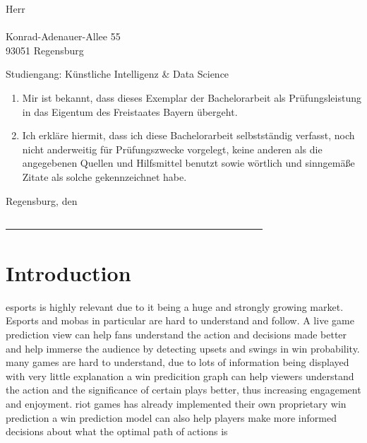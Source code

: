 \documentclass[12pt, a4paper, headinclude, twoside, plainheadsepline, open=right, numbers=noenddot, hidelinks, toc=listof, toc=bibliography]{scrreprt}
\begin{document}
\noindent
Herr\\
\@author\\
Konrad-Adenauer-Allee 55\\
93051 Regensburg\\
\smallskip

\noindent
Studiengang: Künstliche Intelligenz \& Data Science
\bigskip

\begin{enumerate}
\item Mir ist bekannt, dass dieses Exemplar der Bachelorarbeit als Prüfungsleistung in das Eigentum des Freistaates Bayern übergeht.
\item Ich erkläre hiermit, dass ich diese Bachelorarbeit selbstständig verfasst, noch nicht anderweitig für Prüfungszwecke vorgelegt, keine anderen als die angegebenen Quellen und Hilfsmittel benutzt sowie wörtlich und sinngemäße Zitate als solche gekennzeichnet habe.
\end{enumerate}
\vspace{1cm}
Regensburg, den \@date\\
\medskip
\medskip

\noindent
\underline{~~~~~~~~~~~~~~~~~~~~~~~~~~~~~~~~~~~~~~~~~~~~~~~~~~~~}\\
\@author

\makeatother



\cleardoublepage
{}\tableofcontents 										%




\pagestyle{scrheadings} 																%
\cleardoublepage
{} 																	%

\chapter{Introduction}
\label{chap:intro}


esports is highly relevant due to it being a huge and strongly growing market.
Esports and mobas in particular are hard to understand and follow. A live game prediction view can help fans understand the action and decisions made better and help immerse the audience by detecting upsets and swings in win probability.
many games are hard to understand, due to lots of information being displayed with very little explanation
a win predicition graph can help viewers understand the action and the significance of certain plays better, thus increasing engagement and enjoyment.
riot games has already implemented their own proprietary win prediction
a win prediction model can also help players make more informed decisions about what the optimal path of actions is
\end{document}
